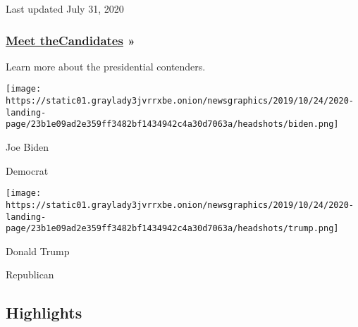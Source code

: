 Last updated July 31, 2020

\hypertarget{meet-thecandidates-}{%
\subsubsection{\texorpdfstring{\href{https://www.nytimes3xbfgragh.onion/interactive/2019/us/politics/2020-presidential-candidates.html}{Meet
the}\href{https://www.nytimes3xbfgragh.onion/interactive/2019/us/politics/2020-presidential-candidates.html}{C}\href{https://www.nytimes3xbfgragh.onion/interactive/2019/us/politics/2020-presidential-candidates.html}{andidates}
»}{Meet theCandidates »}}\label{meet-thecandidates-}}

Learn more about the presidential contenders.

\href{https://www.nytimes3xbfgragh.onion/interactive/2020/us/elections/joe-biden.html}{}

\texttt{[image: https://static01.graylady3jvrrxbe.onion/newsgraphics/2019/10/24/2020-landing-page/23b1e09ad2e359ff3482bf1434942c4a30d7063a/headshots/biden.png]}

Joe Biden

Democrat

\href{https://www.nytimes3xbfgragh.onion/interactive/2020/us/elections/donald-trump.html}{}

\texttt{[image: https://static01.graylady3jvrrxbe.onion/newsgraphics/2019/10/24/2020-landing-page/23b1e09ad2e359ff3482bf1434942c4a30d7063a/headshots/trump.png]}

Donald Trump

Republican

\hypertarget{highlights}{%
\subsection{Highlights}\label{highlights}}

